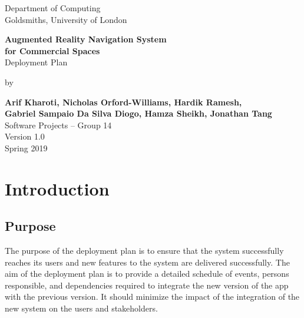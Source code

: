 \documentclass[12pt]{article}
\begin{document}
\begin{titlepage}
    \begin{center}
        \vspace*{1cm}
        Department of Computing\\
        Goldsmiths, University of London\\

        \vspace*{3.25cm}

        \textbf{\LARGE Augmented Reality Navigation System\\}
        \vspace*{0.20cm}           
        \textbf{\LARGE for Commercial Spaces}\\
        \vspace*{0.55cm}           
        {\large Deployment Plan}\\
        \vspace*{0.15cm}           

        \vspace*{2cm}
        by\\
        \vspace*{0.25cm}   

        \textbf{Arif Kharoti, Nicholas Orford-Williams, Hardik Ramesh,\\}
        \textbf{Gabriel Sampaio Da Silva Diogo, Hamza Sheikh, Jonathan Tang\\}
        \vspace*{0.1cm}    
        Software Projects – Group 14\\  

        \vspace{2cm}
        Version 1.0\\
        Spring 2019
        \vfill

        \vspace{1.5cm}

    \end{center}
\end{titlepage}


\section{Introduction}
\subsection{Purpose}
The purpose of the deployment plan is to ensure that the system successfully reaches its users and new features to the system are delivered successfully. The aim of the deployment plan is to provide a detailed schedule of events, persons responsible, and dependencies required to integrate the new version of the app with the previous version. It should minimize the impact of the integration of the new system on the users and stakeholders.
\end{document}
